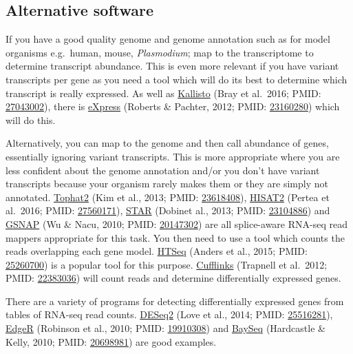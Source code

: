 \documentclass[11pt]{article}
\begin{document}
\hypertarget{alternative-software}{%
\subsection{Alternative software}\label{alternative-software}}

If you have a good quality genome and genome annotation such as for
model organisms e.g.~human, mouse, \textit{Plasmodium}; map to the
transcriptome to determine transcript abundance. This is even more
relevant if you have variant transcripts per gene as you need a tool
which will do its best to determine which transcript is really
expressed. As well as
\href{https://pachterlab.github.io/kallisto/}{Kallisto} (Bray et
al.~2016; PMID:
\href{https://www.ncbi.nlm.nih.gov/pubmed/27043002}{27043002}), there is
\href{https://pachterlab.github.io/eXpress/overview.html}{eXpress}
(Roberts \& Pachter, 2012; PMID:
\href{https://www.ncbi.nlm.nih.gov/pubmed/23160280}{23160280}) which
will do this.

Alternatively, you can map to the genome and then call abundance of
genes, essentially ignoring variant transcripts. This is more
appropriate where you are less confident about the genome annotation
and/or you don't have variant transcripts because your organism rarely
makes them or they are simply not annotated.
\href{https://ccb.jhu.edu/software/tophat/index.shtml}{Tophat2} (Kim et
al., 2013; PMID:
\href{https://www.ncbi.nlm.nih.gov/pubmed/23618408}{23618408}),
\href{https://ccb.jhu.edu/software/hisat2/index.shtml}{HISAT2} (Pertea
et al.~2016; PMID:
\href{https://www.ncbi.nlm.nih.gov/pubmed/27560171}{27560171}),
\href{https://github.com/alexdobin/STAR}{STAR} (Dobinet al., 2013; PMID:
\href{https://www.ncbi.nlm.nih.gov/pubmed/23104886}{23104886}) and
\href{http://research-pub.gene.com/gmap/}{GSNAP} (Wu \& Nacu, 2010;
PMID: \href{https://www.ncbi.nlm.nih.gov/pubmed/20147302}{20147302}) are
all splice-aware RNA-seq read mappers appropriate for this task. You
then need to use a tool which counts the reads overlapping each gene
model. \href{https://htseq.readthedocs.io/en/release_0.10.0/}{HTSeq}
(Anders et al., 2015; PMID:
\href{https://www.ncbi.nlm.nih.gov/pubmed/25260700}{25260700}) is a
popular tool for this purpose.
\href{https://github.com/cole-trapnell-lab/cufflinks}{Cufflinks}
(Trapnell et al.~2012; PMID:
\href{https://www.ncbi.nlm.nih.gov/pubmed/22383036}{22383036}) will
count reads and determine differentially expressed genes.

There are a variety of programs for detecting differentially expressed
genes from tables of RNA-seq read counts.
\href{https://bioconductor.org/packages/release/bioc/html/DESeq2.html}{DESeq2}
(Love et al., 2014; PMID:
\href{https://www.ncbi.nlm.nih.gov/pubmed/25516281}{25516281}),
\href{https://bioconductor.org/packages/release/bioc/html/edgeR.html}{EdgeR}
(Robinson et al., 2010; PMID:
\href{https://www.ncbi.nlm.nih.gov/pubmed/19910308}{19910308}) and
\href{http://bioconductor.org/packages/release/bioc/html/baySeq.html}{BaySeq}
(Hardcastle \& Kelly, 2010; PMID:
\href{https://www.ncbi.nlm.nih.gov/pubmed/20698981}{20698981}) are good
examples.
\end{document}
